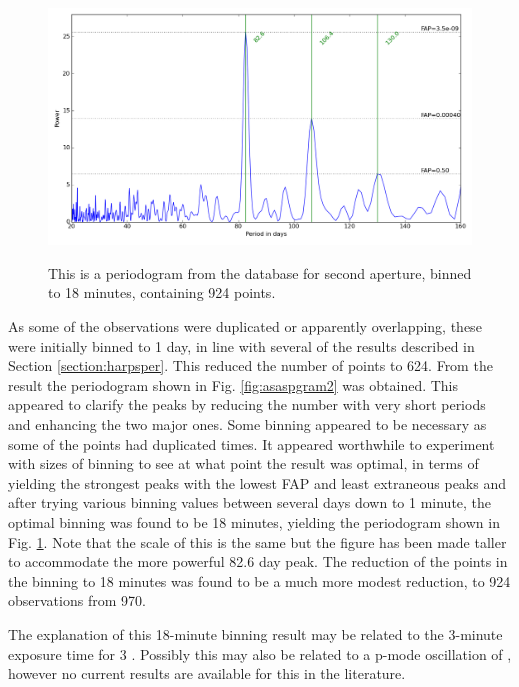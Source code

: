 \begin{figure}[!htbp]
\begin{center}
\includegraphics[scale=0.30]{Figures/asasbin18min.png} \\
\end{center}
\caption{This is a periodogram from the {\asas} database for {\prox} second aperture, binned to 18 minutes, containing 924 points.}
\protect\label{fig:asaspgram3}
\end{figure}

As some of the observations were duplicated or apparently overlapping, these were initially binned to 1 day, in line
with several of the {\harps} results described in Section \ref{section:harpsper}. This reduced the number of points to
624. From the result the periodogram shown in Fig. \ref{fig:asaspgram2} was obtained. This appeared to clarify the peaks
by reducing the number with very short periods and enhancing the two major ones. Some binning appeared to be necessary
as some of the points had duplicated times. It appeared worthwhile to experiment with sizes of binning to see at what
point the result was optimal, in terms of yielding the strongest peaks with the lowest FAP and least extraneous peaks
and after trying various binning values between several days down to 1 minute, the optimal binning was found to be 18
minutes, yielding the periodogram shown in Fig. \ref{fig:asaspgram3}. Note that the scale of this is the same but the
figure has been made taller to accommodate the more powerful 82.6 day peak. The reduction of the points in the binning to
18 minutes was found to be a much more modest reduction, to 924 observations from 970.

The explanation of this 18-minute binning result may be related to the 3-minute exposure time for {\asas} 3
\citep{pojmanski01}. Possibly this may also be related to a p-mode oscillation of \prox, however no current results are
available for this in the literature.

